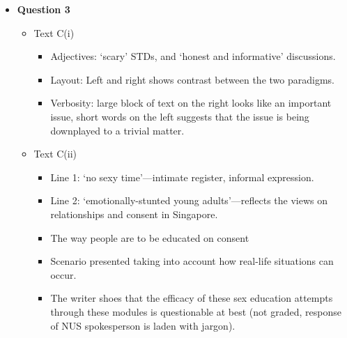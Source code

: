 \documentclass[../main.tex]{subfiles}
\begin{document}
\begin{itemize}
					\item \textbf{Question 3} \begin{itemize}
						\item Text C(i) \begin{itemize}
							\item Adjectives: `scary' STDs, and `honest and informative' discussions.
							\item Layout: Left and right shows contrast between the two paradigms.
							\item Verbosity: large block of text on the right looks like an important issue, short words on the left suggests that the issue is being downplayed to a trivial matter.
						\end{itemize}
						\item Text C(ii) \begin{itemize}
							\item Line 1: `no sexy time'---intimate register, informal expression.
							\item Line 2: `emotionally-stunted young adults'---reflects the views on relationships and consent in Singapore.
							\item The way people are to be educated on consent
							\item Scenario presented taking into account how real-life situations can occur.
							\item The writer shoes that the efficacy of these sex education attempts through these modules is questionable at best (not graded, response of NUS spokesperson is laden with jargon).
						\end{itemize}
					\end{itemize}
			

\end{itemize}
\end{document}
